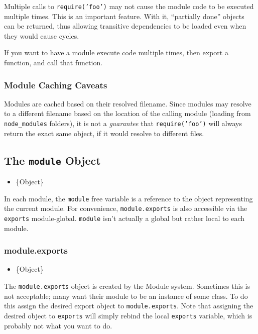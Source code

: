 Multiple calls to \texttt{require('foo')} may not cause the module code
to be executed multiple times. This is an important feature. With it,
``partially done'' objects can be returned, thus allowing transitive
dependencies to be loaded even when they would cause cycles.

If you want to have a module execute code multiple times, then export a
function, and call that function.

\subsubsection{Module Caching Caveats}\label{module-caching-caveats}

Modules are cached based on their resolved filename. Since modules may
resolve to a different filename based on the location of the calling
module (loading from \texttt{node\_modules} folders), it is not a
\emph{guarantee} that \texttt{require('foo')} will always return the
exact same object, if it would resolve to different files.

\subsection{The \texttt{module} Object}\label{the-module-object}

\begin{itemize}
\itemsep1pt\parskip0pt
\item
  \{Object\}
\end{itemize}

In each module, the \texttt{module} free variable is a reference to the
object representing the current module. For convenience,
\texttt{module.exports} is also accessible via the \texttt{exports}
module-global. \texttt{module} isn't actually a global but rather local
to each module.

\subsubsection{module.exports}\label{module.exports}

\begin{itemize}
\itemsep1pt\parskip0pt
\item
  \{Object\}
\end{itemize}

The \texttt{module.exports} object is created by the Module system.
Sometimes this is not acceptable; many want their module to be an
instance of some class. To do this assign the desired export object to
\texttt{module.exports}. Note that assigning the desired object to
\texttt{exports} will simply rebind the local \texttt{exports} variable,
which is probably not what you want to do.

